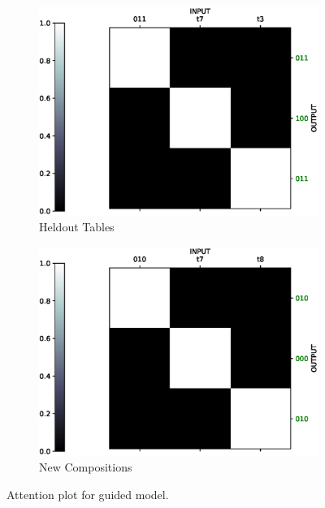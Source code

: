 \begin{figure}[H] 
	\begin{subfigure}[b]{0.5\linewidth}
		\centering
		\includegraphics[width=0.95\linewidth]{./figs/lookup/attn/learned1-eps}
		\caption{Heldout Tables} 
		\label{lrn_attn1} 
		\vspace{2ex}
	\end{subfigure}%
	\begin{subfigure}[b]{0.5\linewidth}
		\centering
		\includegraphics[width=0.95\linewidth]{./figs/lookup/attn/learned2-eps}
		\caption{New Compositions} 
		\label{lrn_attn2} 
		\vspace{2ex}
	\end{subfigure}
	\caption{Attention plot for guided model.}
	\label{lrn_attn}
\end{figure}

